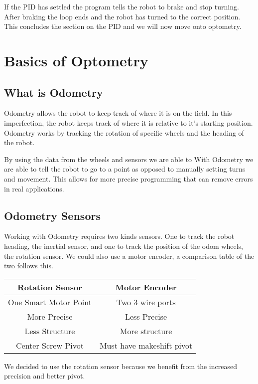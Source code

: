 \documentclass[12pt]{article}
\begin{document}
    If the PID has settled the program tells the robot to brake and stop turning. After braking the loop ends and the robot has turned to the correct position. This concludes the section on the PID and we will now move onto optometry.


\pagebreak
\section{Basics of Optometry}
\subsection{What is Odometry}
    Odometry allows the robot to keep track of where it is on the field. In this imperfection, the robot keeps track of where it is relative to it's starting position. Odometry works by tracking the rotation of specific wheels and the heading of the robot.

    By using the data from the wheels and sensors we are able to
    With Odometry we are able to tell the robot to go to a point as opposed to manually setting turns and movement. This allows for more precise programming that can remove errors in real applications.

\subsection{Odometry Sensors}
    Working with Odometry requires two kinds sensors. One to track the robot heading, the inertial sensor, and one to track the position of the odom wheels, the rotation sensor. We could also use a motor encoder, a comparison table of the two follows this.
    \begin{center}
        \begin{tabular}{c|c}
            Rotation Sensor & Motor Encoder \\
            \hline
            One Smart Motor Point & Two 3 wire ports \\
            More Precise & Less Precise \\
            Less Structure & More structure \\
            Center Screw Pivot & Must have makeshift pivot \\
        \end{tabular}

        We decided to use the rotation sensor because we benefit from the increased precision and better pivot.
    \end{center}
\end{document}

